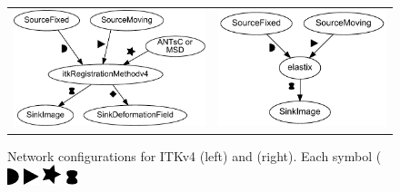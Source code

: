 \begin{figure}[tb!]
\centering
\begin{tabular}{c@{}c}
\includegraphics[scale=0.4]{itkv4graph_manual.pdf}  &
\includegraphics[scale=0.4]{elastixgraph_manual.pdf}
\end{tabular}
\caption{Network configurations for ITKv4 (left) and
\elastix{} (right). Each symbol (\protect\includegraphics[height=1.2ex]{IFmoon.pdf}
\protect\includegraphics[height=1.2ex]{IFtriangle.pdf}
\protect\includegraphics[height=1.2ex]{IFstar.pdf}
\protect\includegraphics[height=1.2ex]{IFbarbapappa.pdf}
}
\end{figure}
